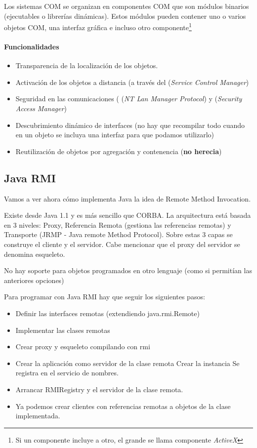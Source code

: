 Los sistemas COM se organizan en componentes COM que son módulos binarios (ejecutables o librerías dinámicas). Estos módulos pueden contener uno o varios objetos COM, una interfaz gráfica e incluso otro componente\footnote{Si un componente incluye a otro, el grande se llama componente \textit{ActiveX}}

\paragraph{Funcionalidades}

\begin{itemize}
	\item Transparencia de la localización de los objetos.
	\item Activación de los objetos a distancia (a través del  (\textit{Service Control Manager})
	\item Seguridad en las comunicaciones ( (\textit{NT Lan Manager Protocol}) y  (\textit{Security Access Manager})
	\item Descubrimiento dinámico de interfaces (no hay que recompilar todo cuando en un objeto se incluya una interfaz para que podamos utilizarlo)
	\item Reutilización de objetos por agregación y contenencia (\textbf{no herecia})
\end{itemize}


\subsection{Java RMI}
Vamos a ver ahora cómo implementa Java la idea de Remote Method Invocation.

Existe desde Java 1.1 y es más sencillo que CORBA. La arquitectura está basada en 3 niveles: Proxy, Referencia Remota (gestiona las referencias remotas) y Transporte (JRMP - Java remote Method Protocol). Sobre estas 3 capas se construye el cliente y el servidor. Cabe mencionar que el proxy del servidor se denomina esqueleto.

\obs No hay soporte para objetos programados en otro lenguaje (como si permitían las anteriores opciones)

Para programar con Java RMI hay que seguir los siguientes pasos:
\begin{itemize}
	\item Definir las interfaces remotas (extendiendo java.rmi.Remote)
	\item Implementar las clases remotas

	\item Crear proxy y esqueleto compilando con rmi
	\item Crear la aplicación como servidor de la clase remota
		\subitem Crear la instancia
		\subitem Se registra en el servicio de nombres.
	\item Arrancar RMIRegistry y el servidor de la clase remota.
	\item Ya podemos crear clientes con referencias remotas a objetos de la clase implementada.
\end{itemize}

